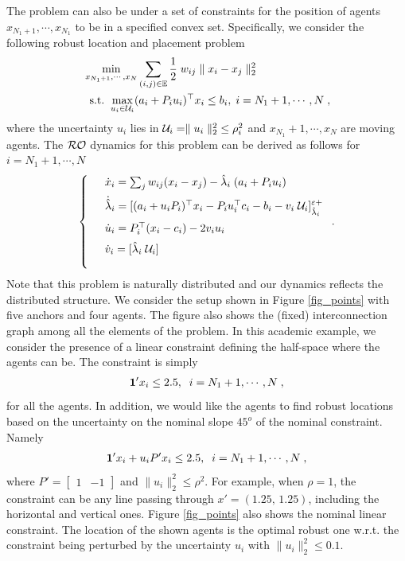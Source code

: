 \documentclass[journal,twoside,web]{ieeecolor}
\begin{document}
The problem can also be under a set of constraints for the position of agents $x_{N_1+1},\cdots,x_{N_1}$ to be in a specified convex set. Specifically, we consider the following robust location and placement problem
\begin{align*}
    &\min_{x_{N_1+1},\cdots,x_N} \sum_{(i,j)\in {\mathbb E}} \frac{1}{2}\; w_{ij} \parallel x_i - x_j \parallel_2^2\\
    &\;\;\text{s.t.}\;\;\underset{u_i\in {\cal U}_i}{\max} (a_i+P_i u_i)^\top x_i \leq b_i, \; i={N_1+1},\cdots,N\;,
\end{align*}
where the uncertainty $u_i$ lies in ${\cal U}_i = \parallel u_i \parallel_2^2\; \leq \rho_i^2$ and $x_{N_1}+1,\cdots,x_{N}$ are moving agents. The ${\cal RO}$ dynamics for this problem can be derived as follows for $i=N_1+1,\cdots,N$
\begin{align*}
\left\{
\begin{array}{cl}
\vspace{2mm}
&\dot{x}_i=\sum_j w_{ij} (x_i-x_j)-\hat \lambda_i \; (a_i+P_i u_i)\\
\vspace{2mm}
&\dot{\hat \lambda}_i=[(a_i+u_i P_i)^\top x_i-P_i u_i^\top c_i-b_i-v_i\; {\cal U}_i]_{\hat \lambda_i}^{\varepsilon+}\\
\vspace{2mm}
&\dot{u}_i=P_i^\top (x_i-c_i)-2v_i u_i\\
\vspace{2mm}
&\dot{v}_i=[\hat \lambda_i\; {\cal U}_i]
\vspace{2mm}
\end{array}\right..
\end{align*}
Note that this problem is naturally distributed and our dynamics reflects the distributed structure. We consider the setup shown in Figure \ref{fig_points} with five anchors and four agents. The figure also shows the (fixed) interconnection graph among all the elements of the problem. In this academic example, we consider the presence of a linear constraint defining the half-space where the agents can be. The constraint is simply
\begin{align*}
{\bf 1}'x_i\leq 2.5, \;\; i=N_1+1,\cdots,N\;,
\end{align*}
for all the agents.
In addition, we would like the agents to find robust locations based on the uncertainty on the nominal slope $45^o$ of the nominal constraint. Namely
\begin{align*}
{\bf 1}'x_i+u_iP'x_i\leq 2.5,\;\; i=N_1+1,\cdots,N\;,
\end{align*}
where $P'=\begin{bmatrix}1&-1\end{bmatrix}$ and $\|u_i\|_2^2\leq \rho^2$. For example, when $\rho=1$, the constraint can be any line passing through $x'=(1.25,\,1.25)$, including the horizontal and vertical ones. Figure \ref{fig_points} also shows the nominal linear constraint. The location of the shown agents is the optimal robust one w.r.t. the constraint being perturbed by the uncertainty $u_i$ with $\|u_i\|_2^2\leq 0.1$.
\end{document}
